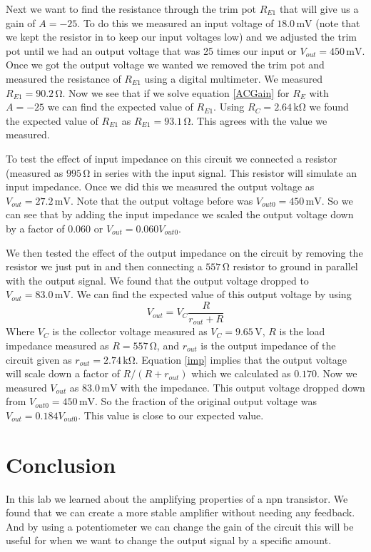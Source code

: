 \documentclass[11pt]{article}
\numberwithin{equation}{section}
\numberwithin{figure}{section}
\numberwithin{table}{section}
\newcommand{\unit}[1]{\ensuremath{\, \mathrm{#1}}}
\begin{document}
Next we want to find the resistance through the trim pot $R_{E1}$ that will give us a gain of $A=-25$. To do this we measured an input voltage of $18.0\unit{mV}$ (note that we kept the resistor in to keep our input voltages low) and we adjusted the trim pot until we had an output voltage that was 25 times our input or $V_{out} = 450\unit{mV}$. Once we got the output voltage we wanted we removed the trim pot and measured the resistance of $R_{E1}$ using a digital multimeter. We measured $R_{E1} = 90.2\unit{\Omega}$. Now we see that if we solve equation \ref{ACGain} for $R_E$ with $A=-25$ we can find the expected value of $R_{E1}$. Using $R_C=2.64\unit{k\Omega}$ we found the expected value of $R_{E1}$ as $R_{E1} = 93.1\unit{\Omega}$. This agrees with the value we measured.

To test the effect of input impedance on this circuit we connected a resistor (measured as $995\unit{\Omega}$ in series with the input signal. This resistor will simulate an input impedance. Once we did this we measured the output voltage as $V_{out} = 27.2\unit{mV}$. Note that the output voltage before was $V_{out0}=450\unit{mV}$. So we can see that by adding the input impedance we scaled the output voltage down by a factor of $0.060$ or $V_{out} = 0.060V_{out0}$. 

We then tested the effect of the output impedance on the circuit by removing the resistor we just put in and then connecting a $557\unit{\Omega}$ resistor to ground in parallel with the output signal. We found that the output voltage dropped to $V_{out}=83.0\unit{mV}$. We can find the expected value of this output voltage by using 
\begin{equation}
V_{out} = V_C\frac{R}{r_{out}+R}
\label{Imp}
\end{equation}
Where $V_C$ is the collector voltage measured as $V_C=9.65\unit{V}$, $R$ is the load impedance measured as $R=557\unit{\Omega}$, and $r_{out}$ is the output impedance of the circuit given as $r_{out} = 2.74\unit{k\Omega}$. Equation \ref{imp} implies that the output voltage will scale down a factor of $R/(R+r_{out})$ which we calculated as $0.170$. Now we measured $V_{out}$ as $83.0\unit{mV}$ with the impedance. This output voltage dropped down from $V_{out0} = 450\unit{mV}$. So the fraction of the original output voltage was $V_{out} = 0.184V_{out0}$. This value is close to our expected value.

\section{Conclusion}
In this lab we learned about the amplifying properties of a npn transistor. We found that we can create a more stable amplifier without needing any feedback. And by using a potentiometer we can change the gain of the circuit this will be useful for when we want to change the output signal by a specific amount.
\end{document}
